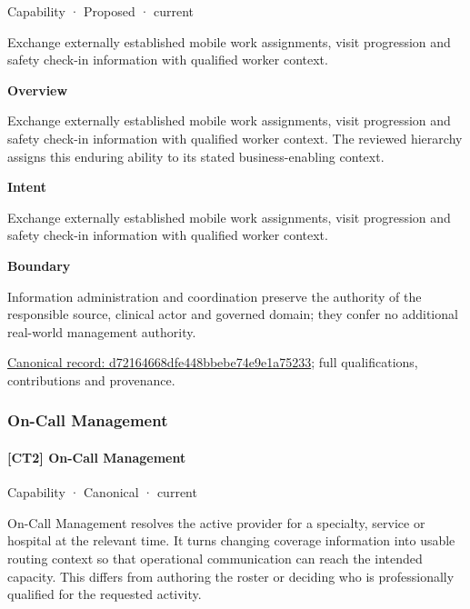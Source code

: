 \label{element:d72164668dfe448bbebe74e9e1a75233}
{\small Capability · Proposed · current}\par

Exchange externally established mobile work assignments, visit progression and safety check-in information with qualified worker context.



\textbf{Overview}



Exchange externally established mobile work assignments, visit progression and safety check-in information with qualified worker context. The reviewed hierarchy assigns this enduring ability to its stated business-enabling context.



\textbf{Intent}



Exchange externally established mobile work assignments, visit progression and safety check-in information with qualified worker context.



\textbf{Boundary}



Information administration and coordination preserve the authority of the responsible source, clinical actor and governed domain; they confer no additional real-world management authority.


{\footnotesize \href{../../../../continuum/strategy/capability/d72164668dfe448bbebe74e9e1a75233.md}{Canonical record: d72164668dfe448bbebe74e9e1a75233}; full qualifications, contributions and provenance.}\par
\subsubsection{On-Call Management}

\paragraph{[CT2] On-Call Management}

\label{element:b16cef8f2bfd4b92948ec75cbcfa7b9a}
{\small Capability · Canonical · current}\par

On-Call Management resolves the active provider for a specialty, service or hospital at the relevant time. It turns changing coverage information into usable routing context so that operational communication can reach the intended capacity. This differs from authoring the roster or deciding who is professionally qualified for the requested activity.



